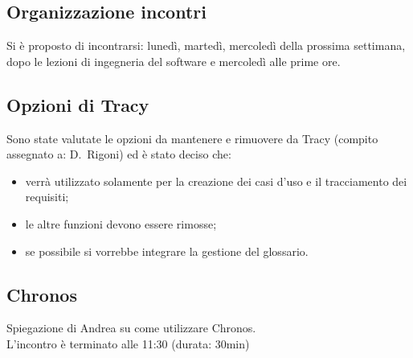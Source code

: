 \documentclass[11pt]{meetingmins}
\begin{document}
\subsection{Organizzazione incontri}

Si \`{e} proposto di incontrarsi: luned\`{i}, marted\`{i}, mercoled\`{i} della prossima settimana, dopo le lezioni di ingegneria del software e mercoled\`{i} alle prime ore.\\

\subsection{Opzioni di Tracy}

Sono state valutate le opzioni da mantenere e rimuovere da Tracy (compito assegnato a: D.~Rigoni) ed è stato deciso che:
\begin{itemize}
\item verrà utilizzato solamente per la creazione dei casi d'uso e il tracciamento dei requisiti;
\item le altre funzioni devono essere rimosse;
\item se possibile si vorrebbe integrare la gestione del glossario.
\end{itemize}

\subsection{Chronos}

Spiegazione di Andrea su come utilizzare Chronos.\\

L'incontro è terminato alle 11:30 (durata: 30min)\\

\end{document}
